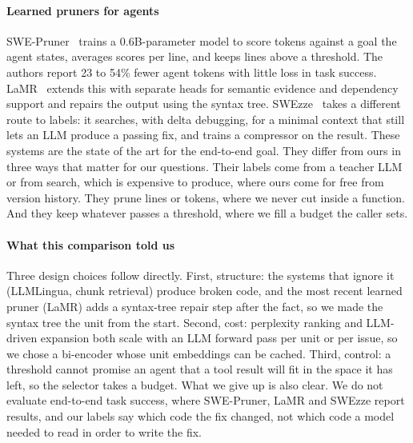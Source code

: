 \paragraph{Learned pruners for agents} SWE-Pruner~\cite{swepruner} trains a 0.6B-parameter model to score tokens against a goal the agent states, averages scores per line, and keeps lines above a threshold. The authors report 23 to 54\% fewer agent tokens with little loss in task success. LaMR~\cite{lamr} extends this with separate heads for semantic evidence and dependency support and repairs the output using the syntax tree. SWEzze~\cite{swezze} takes a different route to labels: it searches, with delta debugging, for a minimal context that still lets an LLM produce a passing fix, and trains a compressor on the result. These systems are the state of the art for the end-to-end goal. They differ from ours in three ways that matter for our questions. Their labels come from a teacher LLM or from search, which is expensive to produce, where ours come for free from version history. They prune lines or tokens, where we never cut inside a function. And they keep whatever passes a threshold, where we fill a budget the caller sets.

\paragraph{What this comparison told us} Three design choices follow directly. First, structure: the systems that ignore it (LLMLingua, chunk retrieval) produce broken code, and the most recent learned pruner (LaMR) adds a syntax-tree repair step after the fact, so we made the syntax tree the unit from the start. Second, cost: perplexity ranking and LLM-driven expansion both scale with an LLM forward pass per unit or per issue, so we chose a bi-encoder whose unit embeddings can be cached. Third, control: a threshold cannot promise an agent that a tool result will fit in the space it has left, so the selector takes a budget. What we give up is also clear. We do not evaluate end-to-end task success, where SWE-Pruner, LaMR and SWEzze report results, and our labels say which code the fix changed, not which code a model needed to read in order to write the fix.


